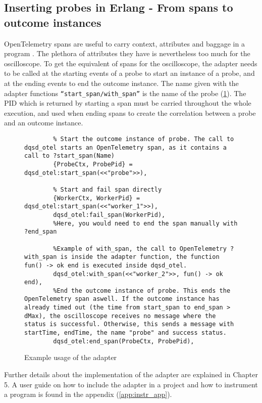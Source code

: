     \subsection{Inserting probes in Erlang - From spans to outcome instances}
        OpenTelemetry spans are useful to carry context, attributes and baggage in a program \cite{otel-t}. The plethora of attributes they have is nevertheless too much for the oscilloscope. 
        To get the equivalent of spans for the oscilloscope, the adapter needs to be called at the starting events of a probe to start an instance of a probe, and at the ending events to end the outcome instance. The name given with the adapter functions \texttt{``start\_span/with\_span''} is the name of the probe (\cref{code:adapter}). The PID which is returned by starting a span must be carried throughout the whole execution, and used when ending spans to create the correlation between a probe and an outcome instance.
\begin{figure}[H]
\centering
   \begin{verbatim}
        % Start the outcome instance of probe. The call to dqsd_otel starts an OpenTelemetry span, as it contains a call to ?start_span(Name)
        {ProbeCtx, ProbePid} = dqsd_otel:start_span(<<"probe">>),  

        % Start and fail span directly
        {WorkerCtx, WorkerPid} = dqsd_otel:start_span(<<"worker_1">>),   
        dqsd_otel:fail_span(WorkerPid),
        %Here, you would need to end the span manually with ?end_span

        %Example of with_span, the call to OpenTelemetry ?with_span is inside the adapter function, the function fun() -> ok end is executed inside dqsd_otel.
        dqsd_otel:with_span(<<"worker_2">>, fun() -> ok end), 
        %End the outcome instance of probe. This ends the OpenTelemetry span aswell. If the outcome instance has already timed out (the time from start_span to end_span > dMax), the oscilloscope receives no message where the status is successful. Otherwise, this sends a message with startTime, endTime, the name "probe" and success status.
        dqsd_otel:end_span(ProbeCtx, ProbePid),
        \end{verbatim}
\caption{Example usage of the adapter}\label{code:adapter}
\end{figure}
    Further details about the implementation of the adapter are explained in Chapter 5. A user guide on how to include the adapter in a project and how to instrument a program is found in the appendix (\cref{app:instr_app}). 
